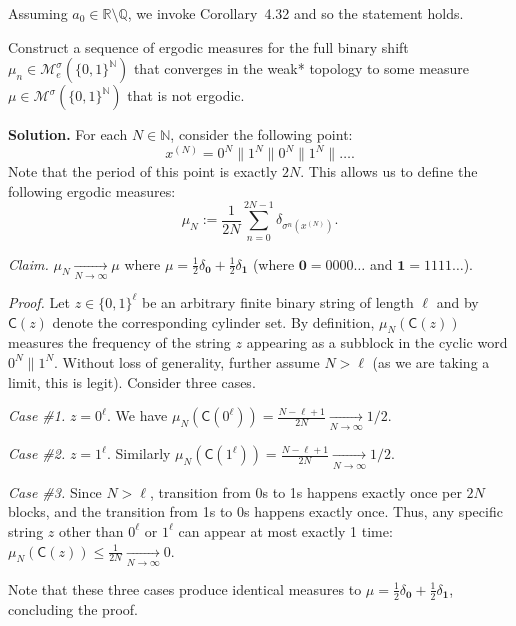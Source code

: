 \documentclass{template}
\begin{document}
Assuming $a_0 \in \mathbb{R} \setminus \mathbb{Q}$, we invoke Corollary~4.32
and so the statement holds.

\begin{problem}[Exercise 4]
    Construct a sequence of ergodic measures for the full binary shift 
    $\mu_n \in \mathcal{M}_e^{\sigma}(\{0,1\}^{\mathbb{N}})$ that converges 
    in the weak* topology to some measure $\mu \in \mathcal{M}^{\sigma}(\{0,1\}^{\mathbb{N}})$
    that is not ergodic.
\end{problem}

\textbf{Solution.} For each $N \in \mathbb{N}$, consider the following point:
\begin{equation*}
    x^{(N)} = 0^N \parallel 1^N \parallel 0^N \parallel 1^N \parallel \dots.
\end{equation*}
Note that the period of this point is exactly $2N$. This allows us to define 
the following ergodic measures:
\begin{equation*}
    \mu_N := \frac{1}{2N}\sum_{n=0}^{2N-1}\delta_{\sigma^n(x^{(N)})}.
\end{equation*}

\textit{Claim.} $\mu_N \xrightarrow[N \to \infty]{} \mu$ where $\mu=\frac{1}{2}\delta_{\mathbf{0}} + \frac{1}{2}\delta_{\mathbf{1}}$ (where $\mathbf{0}=0000\dots$ and $\mathbf{1}=1111\dots$).

\textit{Proof.} Let $z \in \{0,1\}^{\ell}$ be an arbitrary finite binary string
of length $\ell$ and by $\mathsf{C}(z)$ denote the corresponding cylinder set. By
definition, $\mu_N(\mathsf{C}(z))$ measures the frequency of the string $z$
appearing as a subblock in the cyclic word $0^N \parallel 1^N$. Without loss of
generality, further assume $N>\ell$ (as we are taking a limit, this is legit).
Consider three cases.

\textit{Case \#1.} $z=0^{\ell}$. We have $\mu_N(\mathsf{C}(0^{\ell})) = \frac{N-\ell+1}{2N}  \xrightarrow[N \to \infty]{} 1/2$.

\textit{Case \#2.} $z=1^{\ell}$. Similarly $\mu_N(\mathsf{C}(1^{\ell})) = \frac{N-\ell+1}{2N} \xrightarrow[N \to \infty]{} 1/2$.

\textit{Case \#3.} Since $N>\ell$, transition from 0s to 1s happens exactly once 
per $2N$ blocks, and the transition from 1s to 0s happens exactly once. Thus, any 
specific string $z$ other than $0^{\ell}$ or $1^{\ell}$ can appear at most exactly 1 time: 
$\mu_N(\mathsf{C}(z)) \leq \frac{1}{2N} \xrightarrow[N \to \infty]{} 0$.

Note that these three cases produce identical measures to $\mu = \frac{1}{2}\delta_{\mathbf{0}} + \frac{1}{2}\delta_{\mathbf{1}}$, concluding the proof.
\end{document}
